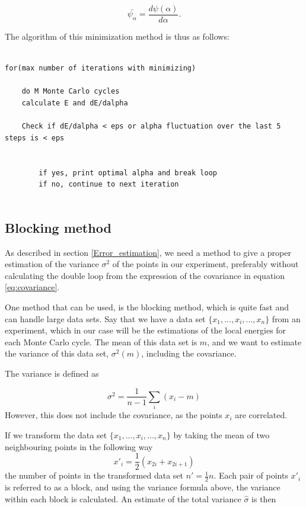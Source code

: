\documentclass[norsk,a4paper,12pt]{article}
\begin{document}
\begin{equation}
	\bar{\psi_{\alpha}} = \frac{d \psi (\alpha)}{d \alpha}.
\end{equation}

The algorithm of this minimization method is thus as follows:

\lstset{basicstyle=\scriptsize}
\begin{lstlisting}

for(max number of iterations with minimizing)
	
	do M Monte Carlo cycles
	calculate E and dE/dalpha 
	
	Check if dE/dalpha < eps or alpha fluctuation over the last 5 steps is < eps
	
	
		if yes, print optimal alpha and break loop
		if no, continue to next iteration


\end{lstlisting}

\subsection{Blocking method} \label{Blocking}

As described in section \ref{Error_estimation}, we need a method to give a proper estimation of the variance $\sigma^2$ of the points in our experiment, preferably without calculating the double loop from the expression of the covariance in equation \ref{eq:covariance}. 
\par 
\vspace{3mm}

One method that can be used, is the blocking method, which is quite fast and can handle large data sets. Say that we have a data set $\{x_1, ...,x_i,..., x_n\}$ from an experiment, which in our case will be the estimations of the local energies for each Monte Carlo cycle. The mean of this data set is $m$, and we want to estimate the variance of this data set, $\sigma^2 (m)$, including the covariance.

The variance is defined as 

\begin{equation}
	\sigma^2 = \frac{1}{n-1} \sum_i (x_i - m)
\end{equation}
However, this does not include the covariance, as the points $x_i$ are correlated.

If we transform the data set $\{x_1, ...,x_i,..., x_n\}$ by taking the mean of two neighbouring points in the following way
\begin{equation}
	x'_i = \frac{1}{2}(x_{2i} + x_{2i+1})
\end{equation}
the number of points in the transformed data set $n' = \frac{1}{2} n$. Each pair of points $x'_i$ is referred to as a block, and using the variance formula above, the variance within each block is calculated. An estimate of the total variance $\hat{\sigma}$ is then
 
\end{document}

